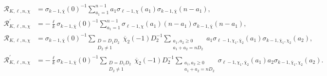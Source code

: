 \documentclass[11pt,letterpaper,reqno]{amsart}
\numberwithin{figure}{section}
\numberwithin{table}{section}
\theoremstyle{definition}
\theoremstyle{plain}
\theoremstyle{definition}
\theoremstyle{definition}
\theoremstyle{remark}
\numberwithin{equation}{section}
\theoremstyle{remark}
\begin{document}
\begin{align*}
    \mathcal{R}_{K,\ell,n,\chi}&=\sigma_{k-1,\overline{\chi}}(0)^{-1}\sum_{a_1=1}^{n-1}a_1\sigma_{\ell-1,\chi}(a_1)\sigma_{k-1,\overline{\chi}}(n-a_1),\\
    \mathcal{R}_{K,\ell,n,\chi}^{\prime}&=-\frac{\ell}{k}\sigma_{k-1,\overline{\chi}}(0)^{-1}\sum_{a_1=1}^{n-1}\sigma_{\ell-1,\chi}(a_1)(n-a_1)\sigma_{k-1,\overline{\chi}}(n-a_1),\\
\mathscr{R}_{K,\ell,n,\chi}&=\sigma_{k-1,\overline{\chi}}(0)^{-1}\sum\limits_{\substack{D=D_1D_2\\D_2\neq 1}}\overline{\chi}_2(-1)D_2^{-1}\sum\limits_{\substack{a_1,a_2\geq0\\a_1+a_2=nD_2}}a_1\sigma_{\ell-1,\chi_1,\overline{\chi}_{2}}(a_1)\sigma_{k-1,\overline{\chi}_{1},\chi_2}(a_2),\\
\mathscr{R}^{\prime}_{K,\ell,n,\chi}&=-\frac{\ell}{k}\sigma_{k-1,\overline{\chi}}(0)^{-1}\sum\limits_{\substack{D=D_1D_2\\D_2\neq 1}}\overline{\chi}_2(-1)D_2^{-1}\sum\limits_{\substack{a_1,a_2\geq0\\a_1+a_2=nD_2}}\sigma_{\ell-1,\chi_1,\overline{\chi}_{2}}(a_1)a_2\sigma_{k-1,\overline{\chi}_{1},\chi_2}(a_2).
\end{align*}
\end{document}

